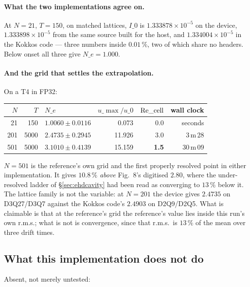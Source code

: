 \documentclass[11pt,a4paper]{article}
\begin{document}
\paragraph{What the two implementations agree on.} At $N=21$, $T=150$, on matched
lattices, $I\_0$ is $1.333878\times10^{-5}$ on the device, $1.333898\times10^{-5}$ from the
same source built for the host, and $1.334004\times10^{-5}$ in the Kokkos code --- three
numbers inside $0.01\,\%$, two of which share no headers. Below onset all three give
$N\_e=1.000$.

\paragraph{And the grid that settles the extrapolation.} On a T4 in FP32:

\begin{center}
\begin{tabular}{rrlrrr}
\hline
$N$ & $T$ & $N\_e$ & $u\_{\max}/u\_0$ & $\mathrm{Re}\_{\rm cell}$ & wall clock \\
\hline
 21 &  150 & $1.0060\pm0.0116$ &  0.073 & 0.0 & seconds \\
201 & 5000 & $2.4735\pm0.2945$ & 11.926 & 3.0 & 3\,m\,28 \\
501 & 5000 & $3.1010\pm0.4139$ & 15.159 & \textbf{1.5} & 30\,m\,09 \\
\hline
\end{tabular}
\end{center}

$N=501$ is the reference's own grid and the first properly resolved point in either
implementation. It gives $10.8\,\%$ \emph{above} Fig.~8's digitised $2.80$, where the
under-resolved ladder of \S\ref{sec:ehdcavity} had been read as converging to $13\,\%$
below it. The lattice family is not the variable: at $N=201$ the device gives $2.4735$ on
D3Q27/D3Q7 against the Kokkos code's $2.4903$ on D2Q9/D2Q5. What is claimable is that at
the reference's grid the reference's value lies inside this run's own r.m.s.; what is not
is convergence, since that r.m.s.\ is $13\,\%$ of the mean over three drift times.

\subsection{What this implementation does not do}

Absent, not merely untested:
\end{document}
